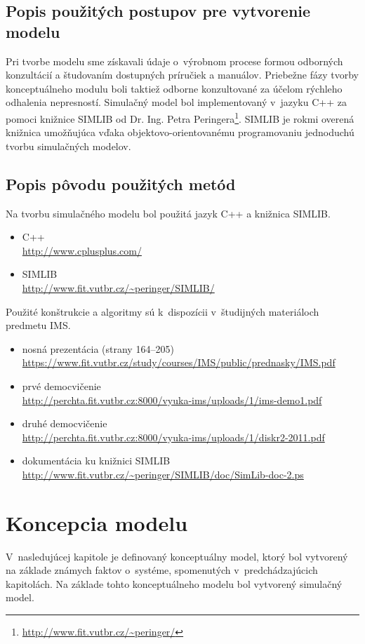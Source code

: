 \documentclass[]{article}
\begin{document}
\subsection{Popis použitých postupov pre vytvorenie modelu}
Pri tvorbe modelu sme získavali údaje o~výrobnom procese formou odborných konzultácií a študovaním dostupných príručiek a manuálov. Priebežne fázy tvorby konceptuálneho modulu boli taktiež odborne konzultované za účelom rýchleho odhalenia nepresností. Simulačný model bol implementovaný v~jazyku C++ za pomoci knižnice SIMLIB od Dr. Ing. Petra Peringera\footnote{\url{http://www.fit.vutbr.cz/~peringer/}}. SIMLIB je rokmi overená knižnica umožňujúca vďaka objektovo-orientovanému programovaniu jednoduchú tvorbu simulačných modelov.

\subsection{Popis pôvodu použitých metód}
Na tvorbu simulačného modelu bol použitá jazyk C++ a knižnica SIMLIB.
\begin{itemize}
	\item C++\\
	\url{http://www.cplusplus.com/}
	\item SIMLIB\\
	\url{http://www.fit.vutbr.cz/~peringer/SIMLIB/}
\end{itemize}

Použité konštrukcie a algoritmy sú k~dispozícii v~študijných materiáloch predmetu IMS.

\begin{itemize}
	\item nosná prezentácia (strany 164--205)\\
	\url{https://www.fit.vutbr.cz/study/courses/IMS/public/prednasky/IMS.pdf}
	\item prvé democvičenie\\
	\url{http://perchta.fit.vutbr.cz:8000/vyuka-ims/uploads/1/ims-demo1.pdf}
	\item druhé democvičenie\\
	\url{http://perchta.fit.vutbr.cz:8000/vyuka-ims/uploads/1/diskr2-2011.pdf}
	\item dokumentácia ku knižnici SIMLIB\\
	\url{http://www.fit.vutbr.cz/~peringer/SIMLIB/doc/SimLib-doc-2.ps}
\end{itemize}

\section{Koncepcia modelu}
V~nasledujúcej kapitole je definovaný konceptuálny model, ktorý bol vytvorený na základe známych faktov o~systéme, spomenutých v~predchádzajúcich kapitolách. Na základe tohto konceptuálneho modelu bol vytvorený simulačný model.
\end{document}
